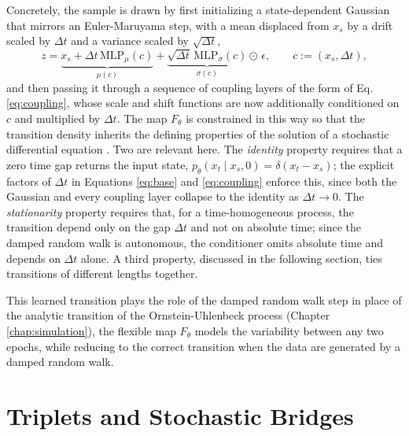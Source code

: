 Concretely, the sample is drawn by first initializing a state-dependent Gaussian that mirrors an Euler-Maruyama step, with a mean displaced from $x_s$ by a drift scaled by $\Delta t$ and a variance scaled by $\sqrt{\Delta t}$,
\begin{equation}
    \label{eq:base}
    z = \underbrace{x_s + \Delta t\,\mathrm{MLP}_\mu(c)}_{\mu(c)} + \underbrace{\sqrt{\Delta t}\,\mathrm{MLP}_\sigma(c)}_{\sigma(c)} \odot\, \epsilon, \qquad c := (x_s, \Delta t),
\end{equation}
and then passing it through a sequence of coupling layers of the form of Eq. \ref{eq:coupling}, whose scale and shift functions are now additionally conditioned on $c$ and multiplied by $\Delta t$. The map $F_\theta$ is constrained in this way so that the transition density inherits the defining properties of the solution of a stochastic differential equation \parencite{Kiyohara2025SNF}. Two are relevant here. The \textit{identity} property requires that a zero time gap returns the input state, $p_\theta(x_t \mid x_s, 0) = \delta(x_t - x_s)$; the explicit factors of $\Delta t$ in Equations \ref{eq:base} and \ref{eq:coupling} enforce this, since both the Gaussian and every coupling layer collapse to the identity as $\Delta t \to 0$. The \textit{stationarity} property requires that, for a time-homogeneous process, the transition depend only on the gap $\Delta t$ and not on absolute time; since the damped random walk is autonomous, the conditioner omits absolute time and depends on $\Delta t$ alone. A third property, discussed in the following section, ties transitions of different lengths together.

This learned transition plays the role of the damped random walk step in place of the analytic transition of the Ornstein-Uhlenbeck process (Chapter \ref{chap:simulation}), the flexible map $F_\theta$ models the variability between any two epochs, while reducing to the correct transition when the data are generated by a damped random walk.

\section{Triplets and Stochastic Bridges}
\label{sec:bridges}

